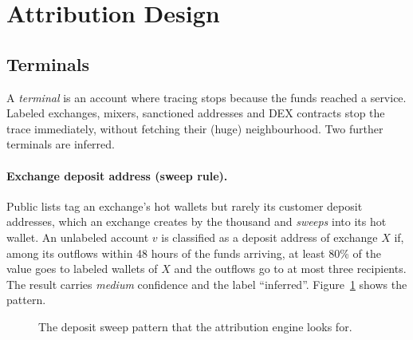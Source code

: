\section{Attribution Design}
\subsection{Terminals}
A \emph{terminal} is an account where tracing stops because the funds reached a service. Labeled exchanges, mixers, sanctioned addresses and DEX contracts stop the trace immediately, without fetching their (huge) neighbourhood. Two further terminals are inferred.

\paragraph{Exchange deposit address (sweep rule).} Public lists tag an exchange's hot wallets but rarely its customer deposit addresses, which an exchange creates by the thousand and \emph{sweeps} into its hot wallet. An unlabeled account $v$ is classified as a deposit address of exchange $X$ if, among its outflows within 48 hours of the funds arriving, at least 80\% of the value goes to labeled wallets of $X$ and the outflows go to at most three recipients. The result carries \emph{medium} confidence and the label ``inferred''. Figure~\ref{fig:sweep} shows the pattern.

\begin{figure}[H]
\centering
{}
\caption{The deposit sweep pattern that the attribution engine looks for.}
\label{fig:sweep}
\end{figure}

